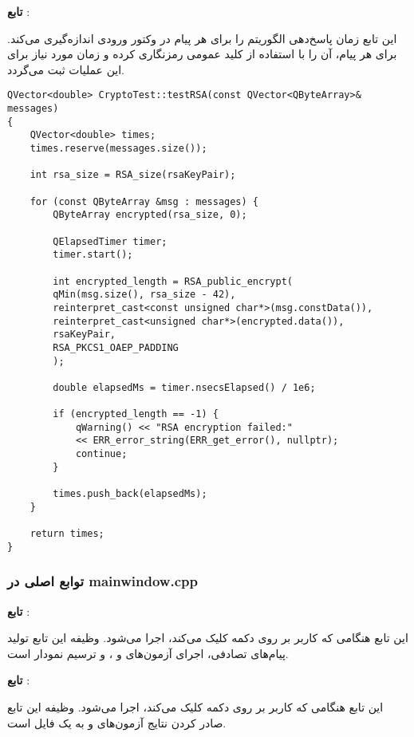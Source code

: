 \documentclass{report}
\begin{document}
\textbf{تابع }:

این تابع زمان پاسخ‌دهی الگوریتم  را برای هر پیام در وکتور ورودی اندازه‌گیری می‌کند. برای هر پیام، آن را با استفاده از کلید عمومی  رمزنگاری کرده و زمان مورد نیاز برای این عملیات ثبت می‌گردد.
\begin{LTR}
    \begin{verbatim}
QVector<double> CryptoTest::testRSA(const QVector<QByteArray>& messages)
{
    QVector<double> times;
    times.reserve(messages.size());
    
    int rsa_size = RSA_size(rsaKeyPair);
    
    for (const QByteArray &msg : messages) {
        QByteArray encrypted(rsa_size, 0);
        
        QElapsedTimer timer;
        timer.start();
        
        int encrypted_length = RSA_public_encrypt(
        qMin(msg.size(), rsa_size - 42),
        reinterpret_cast<const unsigned char*>(msg.constData()),
        reinterpret_cast<unsigned char*>(encrypted.data()),
        rsaKeyPair,
        RSA_PKCS1_OAEP_PADDING
        );
        
        double elapsedMs = timer.nsecsElapsed() / 1e6;
        
        if (encrypted_length == -1) {
            qWarning() << "RSA encryption failed:"
            << ERR_error_string(ERR_get_error(), nullptr);
            continue;
        }
        
        times.push_back(elapsedMs);
    }
    
    return times; 
}
    \end{verbatim}
\end{LTR}

\subsubsection*{توابع اصلی در mainwindow.cpp}

\textbf{تابع }:

این تابع هنگامی که کاربر بر روی دکمه  کلیک می‌کند، اجرا می‌شود. وظیفه این تابع تولید پیام‌های تصادفی، اجرای آزمون‌های  و ، و ترسیم نمودار  است.

\textbf{تابع }:

این تابع هنگامی که کاربر بر روی دکمه  کلیک می‌کند، اجرا می‌شود. وظیفه این تابع صادر کردن نتایج آزمون‌های  و  به یک فایل  است.
\end{document}
